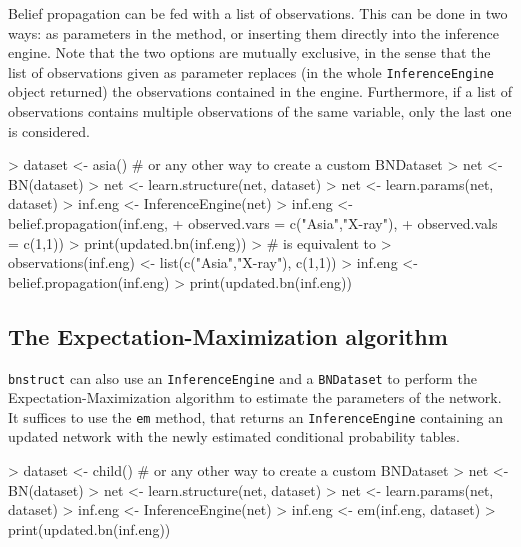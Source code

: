 \documentclass{article}
\newcommand{\Robject}[1]{{\texttt{#1}}}
\newcommand{\Rpackage}[1]{{\texttt{#1}}}
\newcommand{\Rmethod}[1]{{\texttt{#1}}}
\begin{document}
Belief propagation can be fed with a list of observations. This can be done in two ways: as parameters in the method,
or inserting them directly into the inference engine. Note that the two options are mutually exclusive, in the sense that
the list of observations given as parameter replaces (in the whole \Robject{InferenceEngine} object returned)
the observations contained in the engine. Furthermore, if a list of observations contains multiple observations
of the same variable, only the last one is considered.
\begin{Schunk}
\begin{Sinput}
> dataset <- asia() # or any other way to create a custom BNDataset
> net     <- BN(dataset)
> net     <- learn.structure(net, dataset)
> net     <- learn.params(net, dataset)
> inf.eng <- InferenceEngine(net)
> inf.eng <- belief.propagation(inf.eng,
+                               observed.vars = c("Asia","X-ray"),
+                               observed.vals = c(1,1))
> print(updated.bn(inf.eng))
> # is equivalent to
> observations(inf.eng) <- list(c("Asia","X-ray"), c(1,1))
> inf.eng <- belief.propagation(inf.eng)
> print(updated.bn(inf.eng))
\end{Sinput}
\end{Schunk}

\subsection{The Expectation-Maximization algorithm}
\Rpackage{bnstruct} can also use an \Robject{InferenceEngine} and a \Robject{BNDataset} to perform
the Expectation-Maximization algorithm to estimate the parameters of the network.
It suffices to use the \Rmethod{em} method, that returns an \Robject{InferenceEngine} containing
an updated network with the newly estimated conditional probability tables.
\begin{Schunk}
\begin{Sinput}
> dataset <- child() # or any other way to create a custom BNDataset
> net     <- BN(dataset)
> net     <- learn.structure(net, dataset)
> net     <- learn.params(net, dataset)
> inf.eng <- InferenceEngine(net)
> inf.eng <- em(inf.eng, dataset)
> print(updated.bn(inf.eng))
\end{Sinput}
\end{Schunk}



\end{document}
